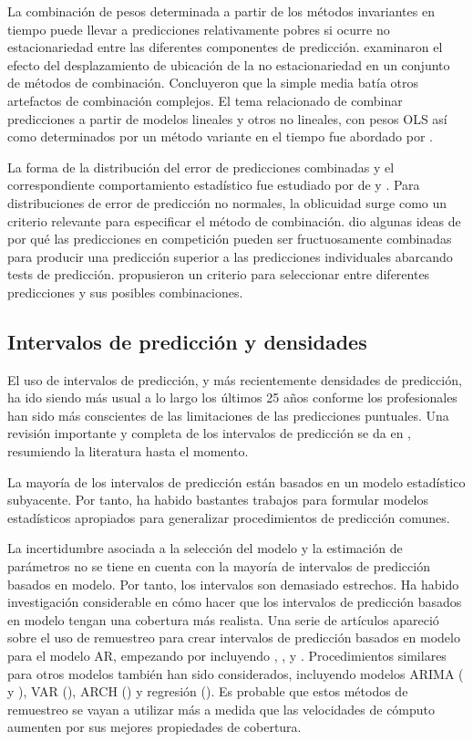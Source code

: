 \documentclass{llncs}
\begin{document}
La combinación de pesos determinada a partir de los métodos invariantes en tiempo puede llevar a predicciones relativamente pobres si ocurre no estacionariedad entre las diferentes componentes de predicción. \cite{Miller1992515} examinaron el efecto del desplazamiento de ubicación de la no estacionariedad en un conjunto de métodos de combinación. Concluyeron que la simple media batía otros artefactos de combinación complejos. El tema relacionado de combinar predicciones a partir de modelos lineales y otros no lineales, con pesos OLS  así como determinados por un método variante en el tiempo fue abordado por \cite{Terui2002421}.

La forma de la distribución del error de predicciones combinadas y el correspondiente comportamiento estadístico fue estudiado por de \cite{DeMenezes1998415} y \cite{Taylor1999325}. Para distribuciones de error de predicción  no normales, la oblicuidad surge como un criterio relevante para especificar el método de combinación. \cite{Fang200387} dio algunas ideas de por qué las predicciones en competición pueden ser fructuosamente combinadas para producir una predicción superior a las predicciones individuales abarcando tests de predicción. \cite{Hibon200515} propusieron un criterio para seleccionar entre diferentes predicciones y sus posibles combinaciones.

\subsection{Intervalos de predicción y densidades}
El uso de intervalos de predicción, y más recientemente densidades de predicción, ha ido siendo más usual a lo largo los últimos 25 años conforme los profesionales han sido más conscientes de las limitaciones de las predicciones puntuales. Una revisión importante y completa de los intervalos de predicción se da en \cite{Chatfield1993121}, resumiendo la literatura hasta el momento.

La mayoría de los intervalos de predicción están basados en un modelo estadístico subyacente. Por tanto, ha habido bastantes trabajos para formular modelos estadísticos apropiados para generalizar procedimientos de predicción comunes.

La incertidumbre asociada a la selección del modelo y la estimación de parámetros no se tiene en cuenta con la mayoría de intervalos de predicción basados en modelo. Por tanto, los intervalos son demasiado estrechos. Ha habido investigación considerable en cómo hacer que los intervalos de predicción basados en modelo tengan una cobertura más realista. Una serie de artículos apareció sobre el uso de remuestreo para crear intervalos de predicción basados en modelo para el modelo AR, empezando por incluyendo \cite{Mccullough1996293}, \cite{Grigoletto1998447}, \cite{Clements2001247} y \cite{Kim200485}. Procedimientos similares para otros modelos también han sido considerados, incluyendo modelos ARIMA (\cite{Pascual2005219} y \cite{Wall2002733}), VAR (\cite{Kim200485}), ARCH (\cite{Reeves2005237}) y regresión (\cite{Lam2002125}). Es probable que estos métodos de remuestreo se vayan a utilizar más a medida que las velocidades de cómputo aumenten por sus mejores propiedades de cobertura.
\end{document}
